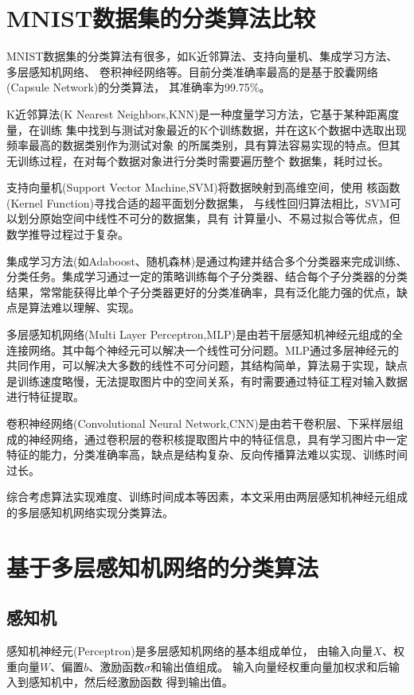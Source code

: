 \documentclass[forprint]{WHUBachelor}
\begin{document}
   \chapter{MNIST数据集的分类算法比较}
   
     MNIST数据集的分类算法有很多，如K近邻算法、支持向量机、集成学习方法、多层感知机网络、
     卷积神经网络等。目前分类准确率最高的是基于胶囊网络(Capsule Network)的分类算法，
     其准确率为99.75\%。
   
     K近邻算法(K Nearest Neighbors,KNN)是一种度量学习方法，它基于某种距离度量，在训练
     集中找到与测试对象最近的K个训练数据，并在这K个数据中选取出现频率最高的数据类别作为测试对象
     的所属类别，具有算法容易实现的特点。但其无训练过程，在对每个数据对象进行分类时需要遍历整个
     数据集，耗时过长。
   
     支持向量机(Support Vector Machine,SVM)将数据映射到高维空间，使用
     核函数(Kernel Function)寻找合适的超平面划分数据集，
     与线性回归算法相比，SVM可以划分原始空间中线性不可分的数据集，具有
     计算量小、不易过拟合等优点，但数学推导过程过于复杂。
   
     集成学习方法(如Adaboost、随机森林)是通过构建并结合多个分类器来完成训练、分类任务。集成学习通过一定的策略训练每个子分类器、结合每个子分类器的分类结果，常常能获得比单个子分类器更好的分类准确率，具有泛化能力强的优点，缺点是算法难以理解、实现。
   
     多层感知机网络(Multi Layer Perceptron,MLP)是由若干层感知机神经元组成的全连接网络。其中每个神经元可以解决一个线性可分问题。MLP通过多层神经元的共同作用，可以解决大多数的线性不可分问题，其结构简单，算法易于实现，缺点是训练速度略慢，无法提取图片中的空间关系，有时需要通过特征工程对输入数据进行特征提取。
   
     卷积神经网络(Convolutional Neural Network,CNN)是由若干卷积层、下采样层组成的神经网络，通过卷积层的卷积核提取图片中的特征信息，具有学习图片中一定特征的能力，分类准确率高，缺点是结构复杂、反向传播算法难以实现、训练时间过长。
   
     综合考虑算法实现难度、训练时间成本等因素，本文采用由两层感知机神经元组成的多层感知机网络实现分类算法。
   
   
   
   \chapter{基于多层感知机网络的分类算法}
   
     \section{感知机}
     感知机神经元(Perceptron)是多层感知机网络的基本组成单位，
     由输入向量$X$、权重向量$W$、偏置$b$、激励函数$\sigma$和输出值组成。
     输入向量经权重向量加权求和后输入到感知机中，然后经激励函数
     得到输出值。
   
\end{document}
